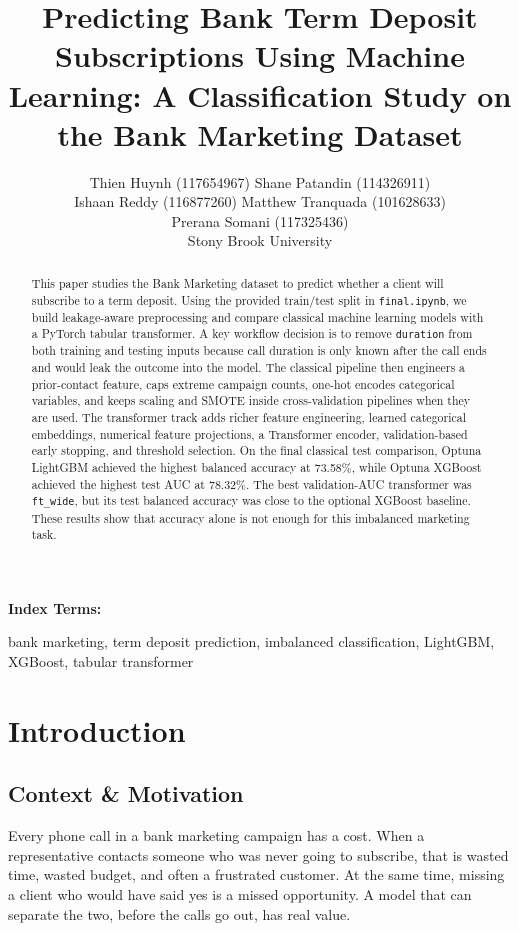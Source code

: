 \documentclass[10pt,twocolumn]{article}
\title{Predicting Bank Term Deposit Subscriptions Using Machine Learning: A Classification Study on the Bank Marketing Dataset}
\author{%
Thien Huynh (117654967) Shane Patandin (114326911)\\
Ishaan Reddy (116877260)
Matthew Tranquada (101628633)\\
Prerana Somani (117325436)\\[0.5em]
Stony Brook University
}
\newenvironment{IEEEkeywords}{%
  \par\smallskip\noindent\textbf{Index Terms:}%
}{\par\smallskip}
\begin{document}
\maketitle

\begin{abstract}
This paper studies the Bank Marketing dataset to predict whether a client will subscribe to a term deposit. Using the provided train/test split in \texttt{final.ipynb}, we build leakage-aware preprocessing and compare classical machine learning models with a PyTorch tabular transformer. A key workflow decision is to remove \texttt{duration} from both training and testing inputs because call duration is only known after the call ends and would leak the outcome into the model. The classical pipeline then engineers a prior-contact feature, caps extreme campaign counts, one-hot encodes categorical variables, and keeps scaling and SMOTE inside cross-validation pipelines when they are used. The transformer track adds richer feature engineering, learned categorical embeddings, numerical feature projections, a Transformer encoder, validation-based early stopping, and threshold selection. On the final classical test comparison, Optuna LightGBM achieved the highest balanced accuracy at 73.58\%, while Optuna XGBoost achieved the highest test AUC at 78.32\%. The best validation-AUC transformer was \texttt{ft\_wide}, but its test balanced accuracy was close to the optional XGBoost baseline. These results show that accuracy alone is not enough for this imbalanced marketing task.
\end{abstract}

\begin{IEEEkeywords}
bank marketing, term deposit prediction, imbalanced classification, LightGBM, XGBoost, tabular transformer
\end{IEEEkeywords}

\section{Introduction}

\subsection{Context \& Motivation}
Every phone call in a bank marketing campaign has a cost. When a representative contacts someone who was never going to subscribe, that is wasted time, wasted budget, and often a frustrated customer. At the same time, missing a client who would have said yes is a missed opportunity. A model that can separate the two, before the calls go out, has real value.
\end{document}
